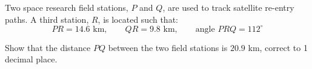 \begin{question}
\noindent Two space research field stations, $P$ and $Q$, are used to track satellite re-entry paths. A third station, $R$, is located such that:
\[
PR = 14.6 \text{ km}, \qquad QR = 9.8 \text{ km}, \qquad \text{angle } PRQ = 112^\circ
\]

\begin{center}
\end{center}

\noindent Show that the distance $PQ$ between the two field stations is $20.9$ km, correct to 1 decimal place.

\vspace{5cm}

\begin{flushright}
\end{flushright}
\end{question}

